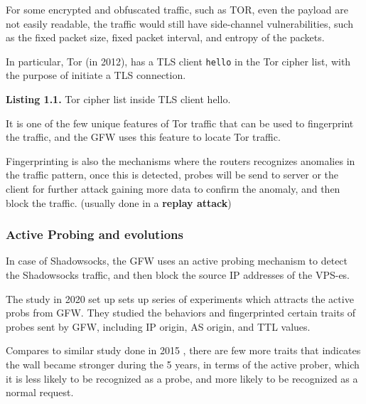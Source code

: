 \documentclass[sigconf]{acmart}
\begin{document}
For some encrypted and obfuscated traffic, such as TOR, even the payload
are not easily readable, the traffic would still have side-channel
vulnerabilities, such as the fixed packet size, fixed packet interval,
and entropy of the packets. \cite{50_tor_finger} \cite{56_gfwTOR}
\cite{57_blockingTor}

In particular, Tor (in 2012), has a TLS client \texttt{hello} in the Tor
cipher list, with the purpose of initiate a TLS connection.

\begin{Shaded}
\begin{Highlighting}[]
\end{Highlighting}
\end{Shaded}

\textbf{Listing 1.1.} Tor cipher list inside TLS client hello.

It is one of the few unique features of Tor traffic that can be used to
fingerprint the traffic, and the GFW uses this feature to locate Tor
traffic.

Fingerprinting is also the mechanisms where the routers recognizes
anomalies in the traffic pattern, \cite{26_gfwSS2020} once this is
detected, probes will be send to server or the client for further attack
gaining more data to confirm the anomaly, and then block the traffic.
(usually done in a \textbf{replay attack})

\hypertarget{active-probing-and-evolutions}{%
\subsubsection{Active Probing and
evolutions}\label{active-probing-and-evolutions}}

In case of Shadowsocks, the GFW uses an active probing mechanism to
detect the Shadowsocks traffic, and then block the source IP addresses
of the VPS-es.

The study in 2020 set up sets up series of experiments which attracts
the active probs from GFW. They studied the behaviors and fingerprinted
certain traits of probes sent by GFW, including IP origin, AS origin,
and TTL values.

Compares to similar study done in 2015 \cite{46_gfw-discover}, there are
few more traits that indicates the wall became stronger during the 5
years, in terms of the active prober, which it is less likely to be
recognized as a probe, and more likely to be recognized as a normal
request.
\end{document}
